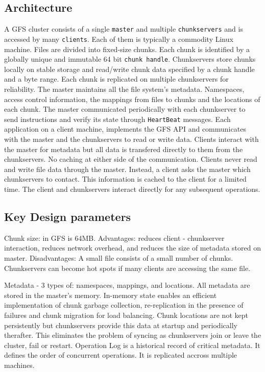 \documentclass[letterpaper,twocolumn,10pt]{article}
\begin{document}
\subsection{Architecture}
A GFS cluster consists of a single {\tt master} and multiple {\tt chunkservers} and is accessed by many {\tt clients}. Each of them is typically a commodity Linux machine.
Files are divided into fixed-size {chunks}. Each chunk is identified by a globally unique and immutable 64 bit {\tt chunk handle}. Chunkservers store chunks locally on stable storage and read/write chunk data specified by a chunk handle and a byte range. Each chunk is replicated on multiple chunkservers for reliability.
The master maintains all the file system's metadata. Namespaces, access control information, the mappings from files to chunks and the locations of each chunk. The master communicated periodically with each chunkserver to send instructions and verify its state through {\tt HeartBeat} messages.
Each application on a client machine, implements the GFS API and communicates with the master and the chunkservers to read or write data.
Clients interact with the master for metadata but all data is transfered directly to them from the chunkservers. No caching at either side of the communication. 
Clients never read and write file data through the master. Instead, a client asks the master which chunkservers to contact. This information is cached to the client for a limited time. The client and chunkservers interact directly for any subsequent operations.

\subsection{Key Design parameters}
Chunk size: in GFS is 64MB.
Advantages: reduces client - chunkserver interaction, reduces network overhead, and reduces the size of metadata stored on master.
Disadvantages: A small file consists of a small number of chunks. Chunkservers can become hot spots if many clients are accessing the same file.

Metadata - 3 types of: namespaces, mappings, and locations. All metadata are stored in the master's memory.
In-memory state enables an efficient implementation of chunk garbage collection, re-replication in the presence of failures and chunk migration for load balancing.
Chunk locations are not kept persistently but chunkservers provide this data at startup and periodically therafter. This eliminates the problem of syncing as chunkservers join or leave the cluster, fail or restart.
Operation Log is a historical record of critical metadata. It defines the order of concurrent operations. It is replicated accross multiple machines.
\end{document}
